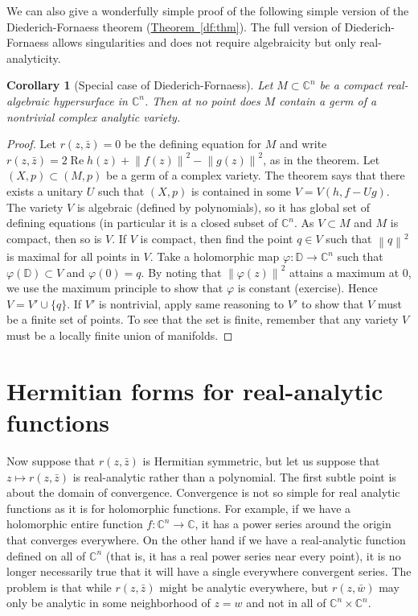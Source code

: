 \documentclass[12pt,openany]{book}
\renewcommand{\Re}{\operatorname{Re}}
\newcommand{\norm}[1]{\left\lVert {#1} \right\rVert}
\newcommand{\C}{{\mathbb{C}}}
\newcommand{\bD}{{\mathbb{D}}}
\newcommand{\sectionnewpage}{}
\theoremstyle{plain}
\newtheorem{cor}[thm]{Corollary}
\theoremstyle{remark}
\theoremstyle{definition}
\theoremstyle{exercise}
\theoremstyle{example}
\newcommand{\thmref}[1]{\hyperref[#1]{Theorem~\ref*{#1}}}
\begin{document}
We can also give a wonderfully simple proof of the following simple
version of the Diederich-Fornaess theorem (\thmref{df:thm}).
The full version of
Diederich-Fornaess allows singularities and does not require algebraicity but
only real-analyticity.

\begin{cor}[Special case of Diederich-Fornaess]
Let $M \subset \C^n$ be a compact real-algebraic hypersurface in $\C^n$.
Then at no point does $M$ contain a germ of a nontrivial complex analytic variety.
\end{cor}

\begin{proof}
Let $r(z,\bar{z})=0$ be the defining equation for $M$ and write
$r(z,\bar{z}) = 2 \Re h(z) + \norm{f(z)}^2-\norm{g(z)}^2$, as in the theorem.
Let $(X,p) \subset (M,p)$ be a germ of a complex variety.  The theorem says
that there exists a unitary $U$ such that $(X,p)$ is contained in some
$V = V(h,f-Ug)$.  The variety $V$ is algebraic (defined by polynomials), so
it has global set of defining equations (in particular it is a closed subset
of $\C^n$.  As $V \subset M$ and $M$ is compact, then so is $V$.  If $V$ is
compact, then find the point $q \in V$ such that $\norm{q}^2$ is maximal for
all points in $V$.  Take a holomorphic map $\varphi \colon \bD \to \C^n$
such that $\varphi(\bD) \subset V$ and $\varphi(0) = q$.  By noting that
$\norm{\varphi(z)}^2$ attains a maximum at $0$, we use the maximum principle
to show that $\varphi$ is constant (exercise).  Hence $V = V' \cup \{ q \}$.
If $V'$ is nontrivial, apply same reasoning to $V'$ to show that $V$ must be
a finite set of points.  To see that the set is finite, remember that any
variety $V$ must be a locally finite union of manifolds.
\end{proof}


\sectionnewpage
\section{Hermitian forms for real-analytic functions} \label{sec:hermforms}

Now suppose that $r(z,\bar{z})$ is Hermitian symmetric, but let us suppose
that $z \mapsto r(z,\bar{z})$ is real-analytic rather than a polynomial.
The first subtle point is
about the domain of convergence.  Convergence is not so simple for real
analytic functions as it is for holomorphic functions.  For example, if we
have a holomorphic entire function $f \colon \C^n \to \C$, it has a power
series around the origin that converges everywhere.  On the other hand
if we have a real-analytic function defined on all of $\C^n$ (that is, it has
a real power series near every point), it is no longer necessarily true that
it will have a single everywhere convergent series.  The problem is that
while $r(z,\bar{z})$ might be analytic everywhere, but
$r(z,\bar{w})$ may only be analytic in some neighborhood of $z=w$ and not in
all of $\C^n \times \C^n$.
\end{document}
